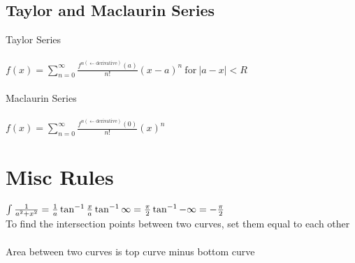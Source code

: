\documentclass[11pt]{article} %
\begin{document}
\subsection{Taylor and Maclaurin Series}
Taylor Series \\
\\
$f(x)=\sum_{n=0}^{\infty}\frac{f^{n\mathrm{(\leftarrow derivative)}}(a)}{n!}(x-a)^{n} \ \mathrm{for} \ \left | a-x \right | < R$ \\
\\
Maclaurin Series \\
\\
$f(x)=\sum_{n=0}^{\infty} \frac{f^{n\mathrm{(\leftarrow derivative)}}(0)}{n!}(x)^{n}$ \\
\section{Misc Rules}
\begin{math}
\int \frac{1}{a^{2}+x^{2}} = \frac{1}{a}\tan^{-1}\frac{x}{a} \\
\\
\tan^{-1}\infty = \frac{\pi}{2} \\
\\
\tan^{-1}-\infty = -\frac{\pi}{2} \\
\end{math}
\\
To find the intersection points between two curves, set them equal to each other \\
\\
Area between two curves is top curve minus bottom curve \\
\\
\end{document}
